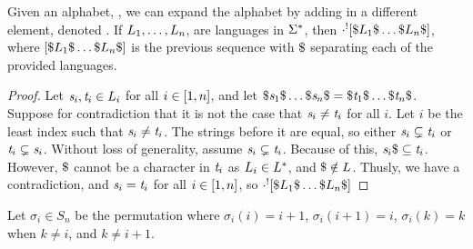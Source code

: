 \begin{theorem}
Given an alphabet, \Alphabet{}, we can expand the alphabet by adding in a different
element, denoted \Sep{}.
If $L_1, \ldots,
L_n$, are languages in $\Sigma^*$, then
$\cdot^![\$L_1\$\ldots\$L_n\$]$,
where $[\$L_1\$\ldots\$L_n\$]$ is the previous
sequence with $\${}$ separating each of the provided languages.
\end{theorem}
\begin{proof}
Let $\mathit{s}_i, \mathit{t}_i\in L_i$ for all $i\in[1,n]$,
and let $\Sep\String_1\Sep\ldots\Sep\String_n\Sep=\Sep\StringAlt_1\Sep\ldots\Sep\StringAlt_n\Sep$.
Suppose for contradiction that it is not the case that $\mathit{s}_i\neq\mathit{t}_i$
for all $i$.
Let $i$ be the least index such that $\mathit{s}_i\neq\mathit{t}_i$.
The strings before it are equal, so either $\mathit{s}_i\subsetneq\mathit{t}_i$ or
$\mathit{t}_i\subsetneq\mathit{s}_i$.
Without loss of generality, assume
$\mathit{s}_i\subsetneq\mathit{t}_i$.  Because of this,
$\mathit{s}_i\$\subseteq\mathit{t}_i$.
However, $\Sep$ cannot be a character in $\mathit{t}_i$ as
$L_i\in L^*$, and $\$\notin L$.
Thusly, we have a contradiction, and $\mathit{s}_i=\mathit{t}_i$ for all
$i\in[1,n]$, so
$\cdot^![\$L_1\$\ldots\$L_n\$]$
\end{proof}

\begin{definition}
Let $\sigma_{i} \in S_n$ be the permutation where
$\sigma_{i}(i) = i+1$, $\sigma_{i}(i+1) = i$, $\sigma_{i}(k) = k$
when $k\neq i$, and $k\neq i+1$.
\end{definition}

